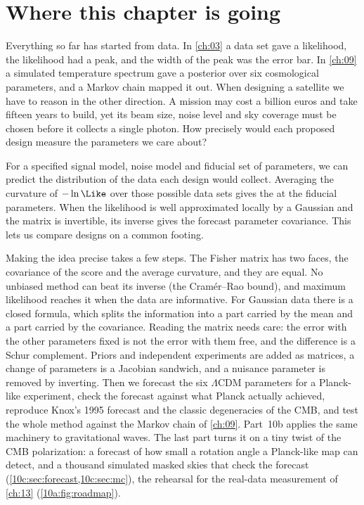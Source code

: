 \section*{Where this chapter is going}
\label{10a:sec:roadmap}

Everything so far has started from data. In \cref{ch:03} a data set gave a likelihood, the likelihood had a
peak, and the width of the peak was the error bar. In \cref{ch:09} a simulated temperature spectrum gave a
posterior over six cosmological parameters, and a Markov chain mapped it out. When designing a satellite we have to reason in the other direction. A
mission may cost a billion euros and take fifteen years to build, yet its
beam size, noise level and sky coverage must be chosen before it collects a
single photon. How precisely would each proposed design measure the
parameters we care about?

For a specified signal model, noise model and fiducial set of parameters,
we can predict the distribution of the data each design would collect.
Averaging the curvature of $-\ln\Like$ over those possible data sets gives
the  at the fiducial parameters. When the likelihood
is well approximated locally by a Gaussian and the matrix is invertible,
its inverse gives the forecast parameter covariance. This lets us compare
designs on a common footing.

Making the idea precise takes a few steps. The Fisher matrix has two faces, the covariance of
the score and the average curvature, and they are equal. No unbiased method can beat its inverse (the
Cram\'er--Rao bound), and maximum likelihood reaches it when the data are informative. For Gaussian data
there is a closed formula, which splits the information into a part carried by the mean and a part
carried by the covariance. Reading the matrix needs care: the error with the other parameters fixed is not
the error with them free, and the difference is a Schur complement. Priors and independent experiments
are added as matrices, a change of parameters is a Jacobian sandwich, and a nuisance parameter is removed
by inverting. Then we forecast the six $\Lambda$CDM parameters for a Planck-like experiment, check the
forecast against what Planck actually achieved, reproduce Knox's 1995 forecast and the classic
degeneracies of the CMB, and test the whole method against the Markov chain of \cref{ch:09}. Part~10b
applies the same machinery to gravitational waves. The last part turns it on a tiny twist of the CMB
polarization: a forecast of how small a rotation angle a Planck-like map can detect, and a thousand simulated
masked skies that check the forecast (\cref{10c:sec:forecast,10c:sec:mc}), the rehearsal for the real-data
measurement of \cref{ch:13} (\cref{10a:fig:roadmap}).

